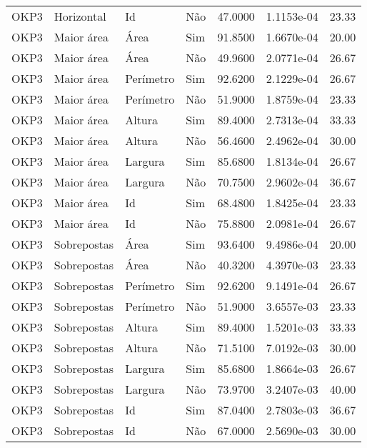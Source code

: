 \begin{tabular}{llllrrr}
OKP3      & Horizontal  & Id        & Não         & 47.0000      & 1.1153e-04 & 23.33    \\
OKP3      & Maior área  & Área      & Sim         & 91.8500      & 1.6670e-04 & 20.00    \\
OKP3      & Maior área  & Área      & Não         & 49.9600      & 2.0771e-04 & 26.67    \\
OKP3      & Maior área  & Perímetro & Sim         & 92.6200      & 2.1229e-04 & 26.67    \\
OKP3      & Maior área  & Perímetro & Não         & 51.9000      & 1.8759e-04 & 23.33    \\
OKP3      & Maior área  & Altura    & Sim         & 89.4000      & 2.7313e-04 & 33.33    \\
OKP3      & Maior área  & Altura    & Não         & 56.4600      & 2.4962e-04 & 30.00    \\
OKP3      & Maior área  & Largura   & Sim         & 85.6800      & 1.8134e-04 & 26.67    \\
OKP3      & Maior área  & Largura   & Não         & 70.7500      & 2.9602e-04 & 36.67    \\
OKP3      & Maior área  & Id        & Sim         & 68.4800      & 1.8425e-04 & 23.33    \\
OKP3      & Maior área  & Id        & Não         & 75.8800      & 2.0981e-04 & 26.67    \\
OKP3      & Sobrepostas & Área      & Sim         & 93.6400      & 9.4986e-04 & 20.00    \\
OKP3      & Sobrepostas & Área      & Não         & 40.3200      & 4.3970e-03 & 23.33    \\
OKP3      & Sobrepostas & Perímetro & Sim         & 92.6200      & 9.1491e-04 & 26.67    \\
OKP3      & Sobrepostas & Perímetro & Não         & 51.9000      & 3.6557e-03 & 23.33    \\
OKP3      & Sobrepostas & Altura    & Sim         & 89.4000      & 1.5201e-03 & 33.33    \\
OKP3      & Sobrepostas & Altura    & Não         & 71.5100      & 7.0192e-03 & 30.00    \\
OKP3      & Sobrepostas & Largura   & Sim         & 85.6800      & 1.8664e-03 & 26.67    \\
OKP3      & Sobrepostas & Largura   & Não         & 73.9700      & 3.2407e-03 & 40.00    \\
OKP3      & Sobrepostas & Id        & Sim         & 87.0400      & 2.7803e-03 & 36.67    \\
OKP3      & Sobrepostas & Id        & Não         & 67.0000      & 2.5690e-03 & 30.00    \\
\hline
\end{tabular}